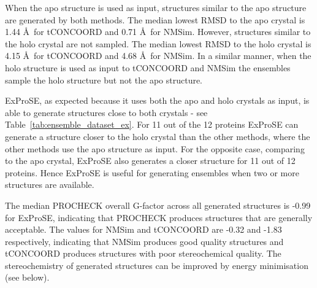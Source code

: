 When the apo structure is used as input, structures similar to the apo structure are generated by both methods.
The median lowest RMSD to the apo crystal is 1.44 \AA\ for tCONCOORD and 0.71 \AA\ for NMSim.
However, structures similar to the holo crystal are not sampled.
The median lowest RMSD to the holo crystal is 4.15 \AA\ for tCONCOORD and 4.68 \AA\ for NMSim.
In a similar manner, when the holo structure is used as input to tCONCOORD and NMSim the ensembles sample the holo structure but not the apo structure.

ExProSE, as expected because it uses both the apo and holo crystals as input, is able to generate structures close to both crystals - see Table~\ref{tab:ensemble_dataset_ex}.
For 11 out of the 12 proteins ExProSE can generate a structure closer to the holo crystal than the other methods, where the other methods use the apo structure as input.
For the opposite case, comparing to the apo crystal, ExProSE also generates a closer structure for 11 out of 12 proteins.
Hence ExProSE is useful for generating ensembles when two or more structures are available.

The median PROCHECK overall G-factor across all generated structures is \mbox{-0.99} for ExProSE, indicating that PROCHECK produces structures that are generally acceptable.
The values for NMSim and tCONCOORD are \mbox{-0.32} and \mbox{-1.83} respectively, indicating that NMSim produces good quality structures and tCONCOORD produces structures with poor stereochemical quality.
The stereochemistry of generated structures can be improved by energy minimisation (see below).



